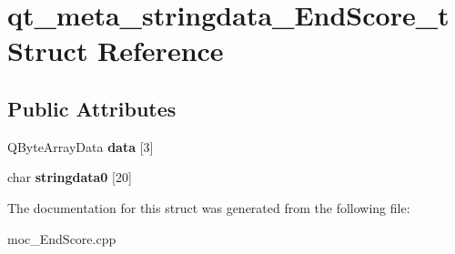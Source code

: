 \hypertarget{structqt__meta__stringdata__EndScore__t}{}\section{qt\+\_\+meta\+\_\+stringdata\+\_\+\+End\+Score\+\_\+t Struct Reference}
\label{structqt__meta__stringdata__EndScore__t}
\subsection*{Public Attributes}
\begin{DoxyCompactItemize}
\item 
Q\+Byte\+Array\+Data {\bfseries data} \mbox{[}3\mbox{]}\hypertarget{structqt__meta__stringdata__EndScore__t_a9f80171958b2e7040252027cdf76b0ae}{}\label{structqt__meta__stringdata__EndScore__t_a9f80171958b2e7040252027cdf76b0ae}

\item 
char {\bfseries stringdata0} \mbox{[}20\mbox{]}\hypertarget{structqt__meta__stringdata__EndScore__t_a686bc2f2054d669307663e769f68dae2}{}\label{structqt__meta__stringdata__EndScore__t_a686bc2f2054d669307663e769f68dae2}

\end{DoxyCompactItemize}


The documentation for this struct was generated from the following file\+:\begin{DoxyCompactItemize}
\item 
moc\+\_\+\+End\+Score.\+cpp\end{DoxyCompactItemize}
